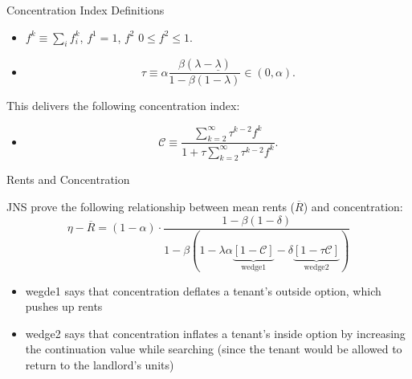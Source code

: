 \documentclass[10pt, xcolor=dvipsnames]{beamer}
\begin{document}
\begin{frame}{Concentration Index}
Definitions
    \begin{itemize}
    \item $f^k \equiv \sum_i f_i^k$, $f^1 = 1$, $f^2$  $0 \leq f^2 \leq 1$.
\item  \begin{equation}
            \tau \equiv \alpha \frac{\beta(\lambda - \underline{\lambda})}{1 - \beta(1 - \lambda)} \in (0, \alpha).
        \end{equation}
\end{itemize}
This delivers the following concentration index:
\begin{itemize}
        \item
            \begin{equation}
                \mathcal{C} \equiv \frac{\sum_{k=2}^{\infty} \tau^{k-2} f^k}{1 + \tau \sum_{k=2}^{\infty} \tau^{k-2} f^k}.
            \end{equation}
\end{itemize}

\end{frame}

\begin{frame}{Rents and Concentration}

JNS prove the following relationship between mean rents ($\overline{R}$) and concentration:\\

\begin{equation}\label{eq:concentration-rents}
    \eta - \overline{R} = (1 - \alpha) \cdot \frac{1 - \beta(1 - \delta)}{1 - \beta \left( 1 - \lambda \alpha \underbrace{[1 - \mathcal{C}]}_{\text{wedge1}} - \delta \underbrace{[1 - \tau \mathcal{C}]}_{\text{wedge2}} \right)}
\end{equation}
\begin{itemize}
    \item wegde1 says that concentration deflates a tenant's outside option, which pushes up rents
    \item wedge2 says that concentration inflates a tenant's inside option by increasing the continuation value while searching (since the tenant would be allowed to return to the landlord's units)
\end{itemize}

\end{frame}
\end{document}
